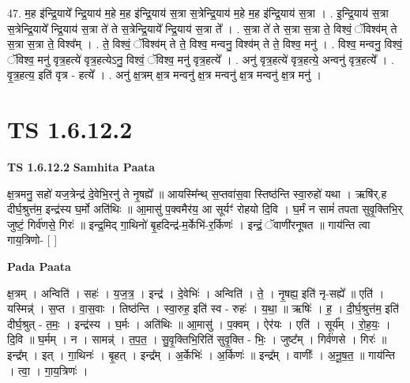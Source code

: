 \documentclass[17pt]{extarticle}
\begin{document}
47. म॒ह इ॑न्द्रि॒याये᳚ न्द्रि॒याय॑ म॒हे म॒ह इ॑न्द्रि॒याय॑ स॒त्रा स॒त्रेन्द्रि॒याय॑ म॒हे म॒ह इ॑न्द्रि॒याय॑ स॒त्रा । . इ॒न्द्रि॒याय॑ स॒त्रा स॒त्रेन्द्रि॒याये᳚ न्द्रि॒याय॑ स॒त्रा ते॑ ते स॒त्रेन्द्रि॒याये᳚ न्द्रि॒याय॑ स॒त्रा ते᳚ । . स॒त्रा ते॑ ते स॒त्रा स॒त्रा ते॒ विश्वं॒ ॅविश्व॑म् ते स॒त्रा स॒त्रा ते॒ विश्व᳚म् । . ते॒ विश्वं॒ ॅविश्व॑म् ते ते॒ विश्व॒ मन्वनु॒ विश्व॑म् ते ते॒ विश्व॒ मनु॑ । . विश्व॒ मन्वनु॒ विश्वं॒ ॅविश्व॒ मनु॑ वृत्र॒हत्ये॑ वृत्र॒हत्येऽनु॒ विश्वं॒ ॅविश्व॒ मनु॑ वृत्र॒हत्ये᳚ । . अनु॑ वृत्र॒हत्ये॑ वृत्र॒हत्ये॒ अन्वनु॑ वृत्र॒हत्ये᳚ । . वृ॒त्र॒हत्य॒ इति॑ वृत्र - हत्ये᳚ । . अनु॑ क्ष॒त्रम् क्ष॒त्र मन्वनु॑ क्ष॒त्र मन्वनु॑ क्ष॒त्र मन्वनु॑ क्ष॒त्र मनु॑ । \newline
\pagebreak
{}
\section*{ TS 1.6.12.2 }

\textbf{TS 1.6.12.2 } \newline
\textbf{Samhita Paata} \newline

क्ष॒त्रमनु॒ सहो॑ यज॒त्रेन्द्र॑ दे॒वेभि॒रनु॑ ते नृ॒षह्ये᳚ ॥ आयस्मि᳚न्थ् स॒प्तवा॑स॒वा स्तिष्ठ॑न्ति स्वा॒रुहो॑ यथा । ऋषि॑र्.ह दीर्घ॒श्रुत्त॑म॒ इन्द्र॑स्य घ॒र्मो अति॑थिः ॥ आ॒मासु॑ प॒क्वमैर॑य॒ आ सूर्यꣳ॑ रोहयो दि॒वि । घ॒र्मं न सामं॑ तपता सुवृ॒क्तिभि॒र् जुष्टं॒ गिर्व॑णसे॒ गिरः॑ ॥ इन्द्र॒मिद् गा॒थिनो॑ बृ॒हदिन्द्र॑-म॒र्केभि॑-र॒र्किणः॑ । इन्द्रं॒ ॅवाणी॑रनूषत ॥ गाय॑न्ति त्वा गाय॒त्रिणो- [ ] \newline

\textbf{Pada Paata} \newline

क्ष॒त्रम् । अन्विति॑ । सहः॑ । य॒ज॒त्र॒ । इन्द्र॑ । दे॒वेभिः॑ । अन्विति॑ । ते॒ । नृ॒षह्य॒ इति॑ नृ-सह्ये᳚ ॥ एति॑ । यस्मिन्न्॑ । स॒प्त । वा॒स॒वाः । तिष्ठ॑न्ति । स्वा॒रुह॒ इति॑ स्व - रुहः॑ । य॒था॒ ॥ ऋषिः॑ । ह॒ । दी॒र्घ॒श्रुत्त॑म॒ इति॑ दीर्घ॒श्रुत् - त॒मः॒ । इन्द्र॑स्य । घ॒र्मः । अति॑थिः ॥ आ॒मासु॑ । प॒क्वम् । ऐर॑यः । एति॑ । सूर्य᳚म् । रो॒ह॒यः॒ । दि॒वि ॥ घ॒र्मम् । न । सामन्न्॑ । त॒प॒त॒ । सु॒वृ॒क्तिभि॒रिति॑ सुवृ॒क्ति - भिः॒ । जुष्ट᳚म् । गिर्व॑णसे । गिरः॑ ॥ इन्द्र᳚म् । इत् । गा॒थिनः॑ । बृ॒हत् । इन्द्र᳚म् । अ॒र्केभिः॑ । अ॒र्किणः॑ ॥ इन्द्र᳚म् । वाणीः᳚ । अ॒नू॒ष॒त॒ ॥ गाय॑न्ति । त्वा॒ । गा॒य॒त्रिणः॑ ।  \newline
\end{document}
